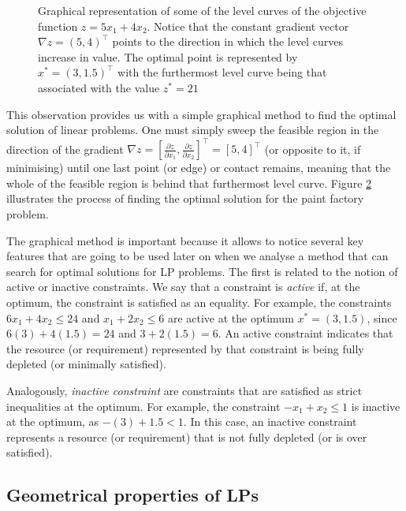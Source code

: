 \begin{figure}
\begin{subfigure}{0.45\textwidth}
		\caption{} \label{p1c1:fig:level_curves_b}	 
	\end{subfigure}
	\caption{Graphical representation of some of the level curves of the objective function $z = 5x_1 + 4x_2$. Notice that the constant gradient vector $\nabla z = (5,4)^\top$ points to the direction in which the level curves increase in value. The optimal point is represented by $x^*=(3, 1.5)^\top$ with the furthermost level curve being that associated with the value $z^* = 21$}	
\end{figure}
%
This observation provides us with a simple graphical method to find the optimal solution of linear problems. One must simply sweep the feasible region in the direction of the gradient $\nabla z=[\frac{\partial z}{\partial x_1},\frac{\partial z}{\partial x_2}]^\top=[5,4]^\top$ (or opposite to it, if minimising) until one last point (or edge) or contact remains, meaning that the whole of the feasible region is behind that furthermost level curve. Figure \ref{p1c1:fig:level_curves_b} illustrates the process of finding the optimal solution for the paint factory problem.

The graphical method is important because it allows to notice several key features that are going to be used later on when we analyse a method that can search for optimal solutions for LP problems. The first is related to the notion of active or inactive constraints. We say that a constraint is \emph{active} if, at the optimum, the constraint is satisfied as an equality. For example, the constraints $6x_1 + 4x_2 \leq 24$ and $x_1 + 2x_2 \leq 6$ are active at the optimum $x^* = (3, 1.5)$, since $6(3) + 4(1.5) = 24$ and $3 + 2(1.5) = 6$. An active constraint indicates that the resource (or requirement) represented by that constraint is being fully depleted (or minimally satisfied). 

Analogously, \emph{inactive constraint} are constraints that are satisfied as strict inequalities at the optimum. For example, the constraint $-x_1 + x_2 \leq 1$ is inactive at the optimum, as $-(3) + 1.5 < 1$. In this case, an inactive constraint represents a resource (or requirement) that is not fully depleted (or is over satisfied).


\subsection{Geometrical properties of LPs}


